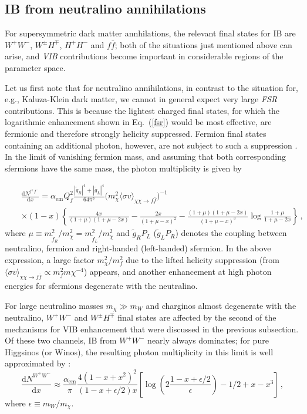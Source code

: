\subsection{IB from neutralino annihilations}

For supersymmetric dark matter annhilations,  the relevant final states for IB are 
$W^+W^-$, $W^\pm H^\mp$, $H^+H^-$ and $f\bar f$; both of the situations just 
mentioned above can arise, and \emph{VIB} contributions become important in 
considerable regions of the parameter space.

Let us first note that for neutralino annihilations, in contrast to the situation 
for, e.g.,  Kaluza-Klein dark matter, we cannot in general expect very large 
\emph{FSR} contributions. This is because the lightest charged final states, for 
which the logarithmic enhancement shown in Eq.~(\ref{fsr}) would be most effective, 
are fermionic and therefore strongly helicity suppressed. Fermion final states 
containing an additional photon, however, are not subject to such a suppression 
\cite{lbe89}. In the limit of vanishing fermion mass, and assuming that both 
corresponding sfermions have the same mass, the photon multiplicity is given by 
\cite{ib_susy}

\begin{eqnarray}
  &&\frac{\mathrm{d}N^{f^+f^-}} {\mathrm{d}x}= 
\alpha_\mathrm{em}Q^2_f\frac{\left|\tilde g_R\right|^4+\left|\tilde 
g_L\right|^4}{64\pi^2} \Big(m_\chi^2 \langle\sigma v\rangle_{\chi\chi\rightarrow 
f\bar f}\Big)^{-1}\\
 &&\times(1-x)\left\{\frac{4x}{(1+\mu)(1+\mu-2x)}-\frac{2x}{(1+\mu-x)^2}
  -\frac{(1+\mu)(1+\mu-2x)}{(1+\mu-x)^3}\log\frac{1+\mu}{1+\mu-2x}\right\}\,,\nonumber
\end{eqnarray}
where $\mu\equiv m_{{\tilde f}_R}^2/m_\chi^2=m_{{\tilde f}_L}^2/m_\chi^2$ and 
$\tilde g_RP_L$ ($\tilde g_LP_R$) denotes the coupling between neutralino, fermion 
and right-handed (left-handed) sfermion. In the above expression, a large factor 
$m_\chi^2/m_f^2$ due to the lifted helicity suppression (from ${\langle\sigma 
v\rangle}_{\chi\chi\rightarrow f\bar f}\propto m_f^2m\chi^{-4}$) appears, and 
another enhancement at high photon energies for sfermions degenerate with the 
neutralino.

For large neutralino masses $m_\chi\gg m_W$ and charginos almost degenerate with 
the neutralino, $W^+W^-$ and $W^\pm H^\mp$ final states are affected by the second 
of the mechanisms for VIB enhancement that were discussed in the previous 
subsection. Of these two channels, IB from $W^+W^-$ nearly always dominates; for 
pure Higgsinos (or Winos), the resulting photon multiplicity in this limit is well 
approximated by \cite{ib_susy,ib_higgsinos}:
\begin{equation}
 \frac{\mathrm{d}N^{W^+W^-}} {\mathrm{d}x} \approx
  \frac{\alpha_\mathrm{em}}{\pi}\frac{4(1-x+x^2)^2}{(1-x+\epsilon/2)x}\left[\log\left(2\frac{1-x+\epsilon/2}{\epsilon}\right)-1/2+x-x^3\right]\,,
\end{equation}
where $\epsilon \equiv m_W/m_\chi$. 

